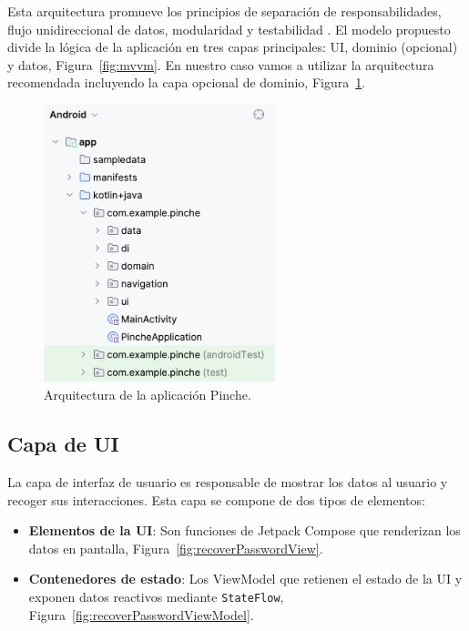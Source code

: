 Esta arquitectura promueve los principios de separación de responsabilidades, flujo unidireccional de datos, modularidad y testabilidad \cite{android-architecture}. El modelo propuesto divide la lógica de la aplicación en tres capas principales: UI, dominio (opcional) y datos, Figura~\ref{fig:mvvm}. En nuestro caso vamos a utilizar la arquitectura recomendada incluyendo la capa opcional de dominio, Figura~\ref{fig:pinche_architecture}.

\begin{figure}[H]
\centering
\includegraphics[width=0.6\textwidth]{./img/description/pinche_architecture.png}
\caption{Arquitectura de la aplicación Pinche.}
\label{fig:pinche_architecture}
\end{figure}

\subsection{Capa de UI}

La capa de interfaz de usuario es responsable de mostrar los datos al usuario y recoger sus interacciones. Esta capa se compone de dos tipos de elementos:

\begin{itemize}
    \item \textbf{Elementos de la UI}: Son funciones de Jetpack Compose que renderizan los datos en pantalla, Figura~\ref{fig:recoverPasswordView}.
    \item \textbf{Contenedores de estado}: Los ViewModel que retienen el estado de la UI y exponen datos reactivos mediante \texttt{StateFlow}, Figura~\ref{fig:recoverPasswordViewModel}.
\end{itemize}

